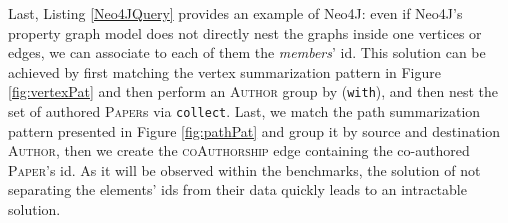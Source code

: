 Last, Listing \ref{Neo4JQuery} provides an example of Neo4J: even if Neo4J's property graph model does not directly nest the graphs inside one vertices or edges, we can associate to each of them the \textit{members}' id. This solution can be achieved by  first matching the vertex summarization pattern in Figure \ref{fig:vertexPat} and then perform an \textsc{Author} group by (\texttt{with}), and then nest the set of authored \textsc{Paper}s via \texttt{collect}. Last, we match the path summarization pattern presented in Figure \ref{fig:pathPat} and group it by source and destination \textsc{Author}, then we create the \textsc{coAuthorship} edge containing the co-authored \textsc{Paper}'s id. As it will be observed within the benchmarks, the solution of not separating the elements' ids from their data quickly leads to an intractable solution. 